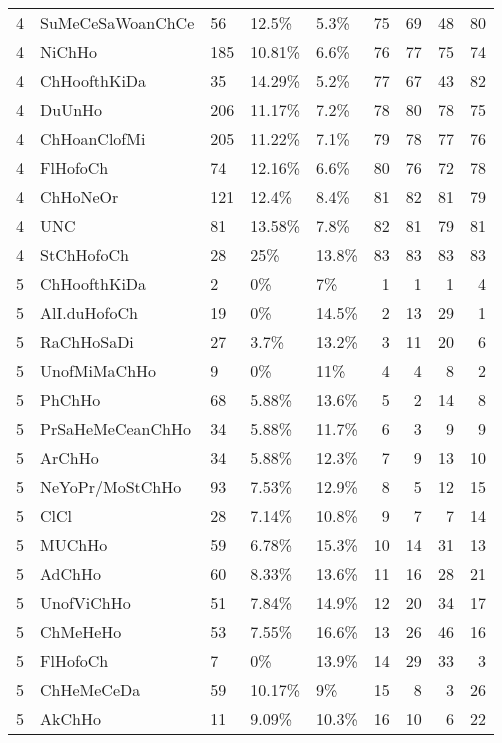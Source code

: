 \begin{longtable}{lllllrrrr}
  4 & SuMeCeSaWoanChCe & 56 & 12.5\% & 5.3\% &  75 &  69 &  48 &  80 \\ 
  4 & NiChHo & 185 & 10.81\% & 6.6\% &  76 &  77 &  75 &  74 \\ 
  4 & ChHoofthKiDa & 35 & 14.29\% & 5.2\% &  77 &  67 &  43 &  82 \\ 
  4 & DuUnHo & 206 & 11.17\% & 7.2\% &  78 &  80 &  78 &  75 \\ 
  4 & ChHoanClofMi & 205 & 11.22\% & 7.1\% &  79 &  78 &  77 &  76 \\ 
  4 & FlHofoCh & 74 & 12.16\% & 6.6\% &  80 &  76 &  72 &  78 \\ 
  4 & ChHoNeOr & 121 & 12.4\% & 8.4\% &  81 &  82 &  81 &  79 \\ 
  4 & UNC & 81 & 13.58\% & 7.8\% &  82 &  81 &  79 &  81 \\ 
  4 & StChHofoCh & 28 & 25\% & 13.8\% &  83 &  83 &  83 &  83 \\ 
  5 & ChHoofthKiDa & 2 & 0\% & 7\% &   1 &   1 &   1 &   4 \\ 
  5 & AlI.duHofoCh & 19 & 0\% & 14.5\% &   2 &  13 &  29 &   1 \\ 
  5 & RaChHoSaDi & 27 & 3.7\% & 13.2\% &   3 &  11 &  20 &   6 \\ 
  5 & UnofMiMaChHo & 9 & 0\% & 11\% &   4 &   4 &   8 &   2 \\ 
  5 & PhChHo & 68 & 5.88\% & 13.6\% &   5 &   2 &  14 &   8 \\ 
  5 & PrSaHeMeCeanChHo & 34 & 5.88\% & 11.7\% &   6 &   3 &   9 &   9 \\ 
  5 & ArChHo & 34 & 5.88\% & 12.3\% &   7 &   9 &  13 &  10 \\ 
  5 & NeYoPr/MoStChHo & 93 & 7.53\% & 12.9\% &   8 &   5 &  12 &  15 \\ 
  5 & ClCl & 28 & 7.14\% & 10.8\% &   9 &   7 &   7 &  14 \\ 
  5 & MUChHo & 59 & 6.78\% & 15.3\% &  10 &  14 &  31 &  13 \\ 
  5 & AdChHo & 60 & 8.33\% & 13.6\% &  11 &  16 &  28 &  21 \\ 
  5 & UnofViChHo & 51 & 7.84\% & 14.9\% &  12 &  20 &  34 &  17 \\ 
  5 & ChMeHeHo & 53 & 7.55\% & 16.6\% &  13 &  26 &  46 &  16 \\ 
  5 & FlHofoCh & 7 & 0\% & 13.9\% &  14 &  29 &  33 &   3 \\ 
  5 & ChHeMeCeDa & 59 & 10.17\% & 9\% &  15 &   8 &   3 &  26 \\ 
  5 & AkChHo & 11 & 9.09\% & 10.3\% &  16 &  10 &   6 &  22 \\ 

\end{longtable}
